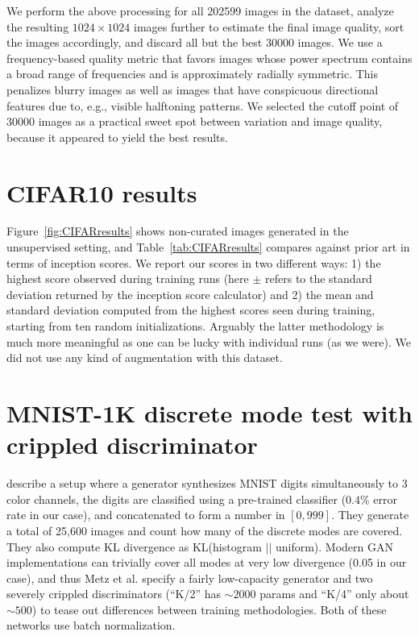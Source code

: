 \documentclass{article}
\newcommand{\FINAL}[2][]{#2} %
\begin{document}
We perform the above processing for all 202599 images in the dataset, analyze the resulting $1024\times1024$ images further to estimate the final image quality, sort the images accordingly, and discard all but the best 30000 images. We use a frequency-based quality metric that favors images whose power spectrum contains a broad range of frequencies and is approximately radially symmetric. This penalizes blurry images as well as images that have conspicuous directional features due to, e.g., visible halftoning patterns.
We selected the cutoff point of 30000 images as a practical sweet spot between variation and image quality, because it appeared to yield the best results.

\section{CIFAR10 results}
\label{sec:CIFAR10}

\figCIFARresults
\tabCIFARresults

Figure~\ref{fig:CIFARresults} shows non-curated images generated in the unsupervised setting, and Table~\ref{tab:CIFARresults} compares against prior art in terms of inception scores. 
\FINAL{We report our scores in two different ways: 1) the highest score observed during training runs (here $\pm$ refers to the standard deviation returned by the inception score calculator) and 2) the mean and standard deviation computed from the highest scores seen during training, starting from ten random initializations. Arguably the latter methodology is much more meaningful as one can be lucky with individual runs (as we were).}
We did not use any kind of augmentation with this dataset.

\section{MNIST-1K discrete mode test with crippled discriminator}
\tabMNIST
\cite{Metz2016} describe a setup where a generator synthesizes MNIST digits simultaneously to 3 color channels, the digits are classified using a pre-trained classifier ($0.4\%$ error rate in our case), and concatenated to form a number in $[0,999]$. They generate a total of 25,600 images and count how many of the discrete modes are covered. They also compute KL divergence as KL(histogram $||$ uniform). Modern GAN implementations can trivially cover all modes at very low divergence (0.05 in our case), and thus Metz et al. specify a fairly low-capacity generator and two severely crippled discriminators (``K/2'' has $\sim2000$ params and ``K/4'' only about $\sim500$) to tease out differences between training methodologies. Both of these networks use batch normalization.
\end{document}
